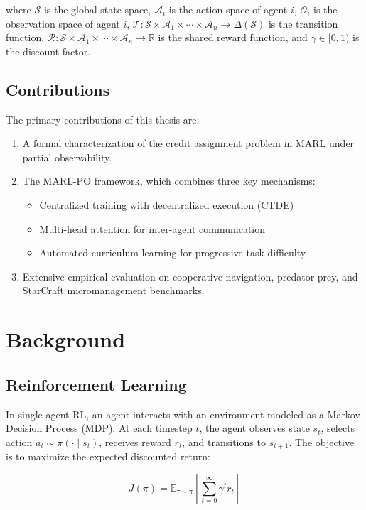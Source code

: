 \documentclass[12pt,a4paper]{report}
\begin{document}
where $\mathcal{S}$ is the global state space, $\mathcal{A}_i$ is the action space of agent $i$,
$\mathcal{O}_i$ is the observation space of agent $i$, $\mathcal{T}: \mathcal{S} \times \mathcal{A}_1 \times \cdots \times \mathcal{A}_n \rightarrow \Delta(\mathcal{S})$ is the transition function,
$\mathcal{R}: \mathcal{S} \times \mathcal{A}_1 \times \cdots \times \mathcal{A}_n \rightarrow \mathbb{R}$
is the shared reward function, and $\gamma \in [0, 1)$ is the discount factor.

\section{Contributions}
The primary contributions of this thesis are:
\begin{enumerate}
    \item A formal characterization of the credit assignment problem in MARL under partial observability.
    \item The MARL-PO framework, which combines three key mechanisms:
    \begin{itemize}
        \item Centralized training with decentralized execution (CTDE)
        \item Multi-head attention for inter-agent communication
        \item Automated curriculum learning for progressive task difficulty
    \end{itemize}
    \item Extensive empirical evaluation on cooperative navigation, predator-prey, and StarCraft micromanagement benchmarks.
\end{enumerate}

\chapter{Background}
\label{ch:background}

\section{Reinforcement Learning}
In single-agent RL, an agent interacts with an environment modeled as a Markov Decision Process (MDP).
At each timestep $t$, the agent observes state $s_t$, selects action $a_t \sim \pi(\cdot \mid s_t)$,
receives reward $r_t$, and transitions to $s_{t+1}$. The objective is to maximize the expected
discounted return:

\begin{equation}
J(\pi) = \mathbb{E}_{\tau \sim \pi}\left[\sum_{t=0}^{\infty} \gamma^t r_t\right]
\label{eq:rl_objective}
\end{equation}
\end{document}
